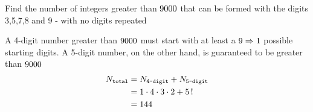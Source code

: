 \question[1] Find the number of integers greater than $9000$ that can be formed with the digits 3,5,7,8 and 9 - with
 no digits repeated


\watchout

\ifprintanswers
\fi 

\begin{solution}[\mcq]
	A 4-digit number greater than $9000$ must start with at least a $9 \Rightarrow 1$ possible starting digits.
	A 5-digit number, on the other hand, is guaranteed to be greater than $9000$
	\begin{align}
		N_{\texttt{total}} &= N_{\texttt{4-digit}} + N_{\texttt{5-digit}} \\
		   &= 1\cdot 4\cdot 3 \cdot 2 + 5\,! \\
		   &= 144
	\end{align}
\end{solution}
